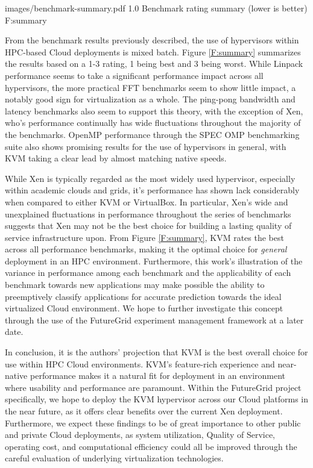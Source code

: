  {images/benchmark-summary.pdf}
  {1.0}
  {Benchmark rating summary (lower is better)}
  {F:summary}


From the benchmark results previously described, the use of hypervisors within HPC-based Cloud deployments is mixed batch.  Figure \ref{F:summary} summarizes the results based on a 1-3 rating, 1 being best and 3 being worst.   While Linpack performance seems to take a significant performance impact across all hypervisors, the more practical FFT benchmarks seem to show little impact, a notably good sign for virtualization as a whole.  The ping-pong bandwidth and latency benchmarks also seem to support this theory, with the exception of Xen, who's performance continually  has wide fluctuations throughout the majority of the benchmarks.  OpenMP performance through the SPEC OMP benchmarking suite also shows promising results for the use of hypervisors in general, with KVM taking a clear lead by almost matching native speeds. 

While Xen is typically regarded as the most widely used hypervisor, especially within academic clouds and grids, it's performance has shown lack considerably when compared to either KVM or VirtualBox.  In particular, Xen's wide and unexplained fluctuations in performance throughout the series of benchmarks suggests that Xen may not be the best choice for building a lasting quality of service infrastructure upon. From Figure \ref{F:summary}, KVM rates the best across all performance benchmarks, making it the optimal choice for {\em general} deployment in an HPC environment.  Furthermore, this work's illustration of the variance in performance among each benchmark and the applicability of each benchmark towards new applications may make possible the ability to preemptively classify applications for accurate prediction towards the ideal virtualized Cloud environment. We hope to further investigate this concept through the use of the FutureGrid experiment management framework at a later date.


In conclusion, it is the authors' projection that KVM is the best overall choice for use within HPC Cloud environments. KVM's feature-rich experience and near-native performance makes it a natural fit for deployment in an environment where usability and performance are paramount.  Within the FutureGrid project specifically, we hope to deploy the KVM hypervisor across our Cloud platforms in the near future, as it offers clear benefits over the current Xen deployment.  Furthermore, we expect these findings to be of great importance to other public and private Cloud deployments, as system utilization, Quality of Service, operating cost, and computational efficiency could all be improved through the careful evaluation of underlying virtualization technologies. 





